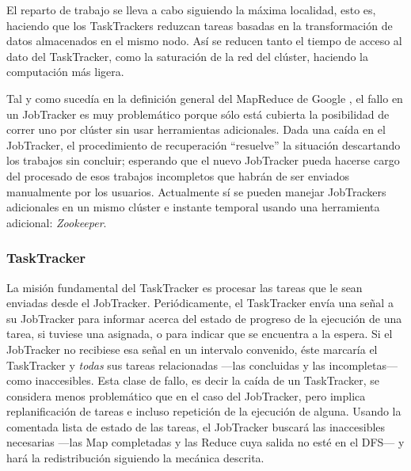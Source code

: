 El reparto de trabajo se lleva a cabo siguiendo la m\'axima localidad, esto es, haciendo que los TaskTrackers reduzcan tareas basadas en la transformaci\'on de datos almacenados en el mismo nodo. As\'i se reducen tanto el tiempo de acceso al dato del TaskTracker, como la saturaci\'on de la red del cl\'uster, haciendo la computaci\'on m\'as ligera.\newline

Tal y como suced\'ia en la definici\'on general del MapReduce de Google \cite{googlemapreduce}, el fallo en un JobTracker es muy problem\'atico porque s\'olo est\'a cubierta la posibilidad de correr uno por cl\'uster sin usar herramientas adicionales. Dada una ca\'ida en el JobTracker, el procedimiento de recuperaci\'on ``resuelve'' la situaci\'on descartando los trabajos sin concluir; esperando que el nuevo JobTracker pueda hacerse cargo del procesado de esos trabajos incompletos que habr\'an de ser enviados manualmente por los usuarios. Actualmente s\'i se pueden manejar JobTrackers adicionales en un mismo cl\'uster e instante temporal usando una herramienta adicional: \emph{Zookeeper}.


\subsubsection{TaskTracker}\label{subsubsec:tasktracker}
\noindent La misi\'on fundamental del TaskTracker es procesar las tareas que le sean enviadas desde el JobTracker. Peri\'odicamente, el TaskTracker env\'ia una se\~nal a su JobTracker para informar acerca del estado de progreso de la ejecuci\'on de una tarea, si tuviese una asignada, o para indicar que se encuentra a la espera. Si el JobTracker no recibiese esa se\~nal en un intervalo convenido, \'este marcar\'ia el TaskTracker y \emph{todas} sus tareas relacionadas ---las concluidas y las incompletas--- como inaccesibles. Esta clase de fallo, es decir la ca\'ida de un TaskTracker, se considera menos problem\'atico que en el caso del JobTracker, pero implica replanificaci\'on de tareas e incluso repetici\'on de la ejecuci\'on de alguna. Usando la comentada lista de estado de las tareas, el JobTracker buscar\'a las inaccesibles necesarias ---las Map completadas y las Reduce cuya salida no est\'e en el DFS--- y har\'a la redistribuci\'on siguiendo la mec\'anica descrita.

